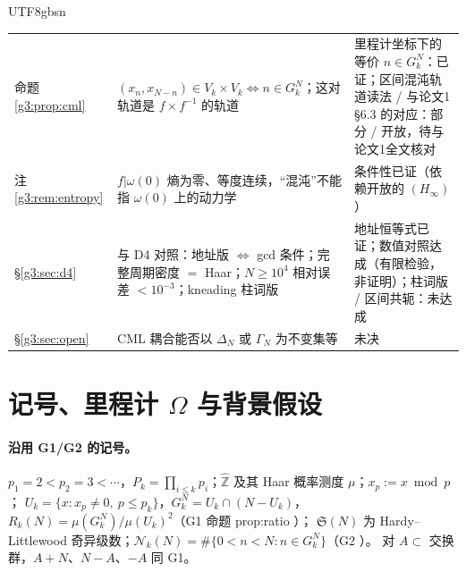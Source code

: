\documentclass[11pt,a4paper]{article}
\newcommand{\Zhat}{\widehat{\mathbb Z}}
\newcommand{\Haar}{\mu}
\newcommand{\Sing}{\mathfrak S}
\newcommand{\Cnt}{\mathcal N}          %
\newcommand{\Om}{\Omega}               %
\theoremstyle{plain}
\theoremstyle{definition}
\begin{document}
\begin{CJK}{UTF8}{gbsn}
\begin{center}
\begin{tabular}{p{2.6cm}p{7.6cm}p{4.2cm}}
命题 \ref{g3:prop:cml} & $(x_n,x_{N-n})\in V_k\times V_k\iff n\in G_k^N$；这对轨道是 $f\times f^{-1}$ 的轨道 & 里程计坐标下的等价 $n\in G_k^N$：已证；区间混沌轨道读法 / 与论文1 \S6.3 的对应：部分 / 开放，待与论文1全文核对\\
注 \ref{g3:rem:entropy} & $f|\omega(0)$ 熵为零、等度连续，“混沌”不能指 $\omega(0)$ 上的动力学 & 条件性已证（依赖开放的 $(H_\infty)$）\\
\S\ref{g3:sec:d4} & 与 D4 对照：地址版 $\iff$ gcd 条件；完整周期密度 $=$ Haar；$N\ge10^4$ 相对误差 $<10^{-3}$；kneading 柱词版 & 地址恒等式已证；数值对照达成（有限检验，非证明）；柱词版 / 区间共轭：未达成\\
\S\ref{g3:sec:open} & CML 耦合能否以 $\Delta_N$ 或 $\Gamma_N$ 为不变集等 & 未决\\
\hline
\end{tabular}
\end{center}

\section{记号、里程计 $\Om$ 与背景假设}\label{g3:sec:notation}

\paragraph{沿用 G1/G2 的记号。}
$p_1=2<p_2=3<\cdots$，$P_k=\prod_{i\le k}p_i$；$\Zhat$ 及其 Haar 概率测度 $\Haar$；$x_p:=x\bmod p$；
$U_k=\{x:x_p\ne0,\ p\le p_k\}$，$G_k^N=U_k\cap(N-U_k)$，$R_k(N)=\Haar(G_k^N)/\Haar(U_k)^2$（G1 命题 prop:ratio \cite{G1}）；
$\Sing(N)$ 为 Hardy--Littlewood 奇异级数；$\Cnt_k(N)=\#\{0<n<N:n\in G_k^N\}$（G2 \cite{G2}）。
对 $A\subset$ 交换群，$A+N$、$N-A$、$-A$ 同 G1。


\end{CJK}
\end{document}
